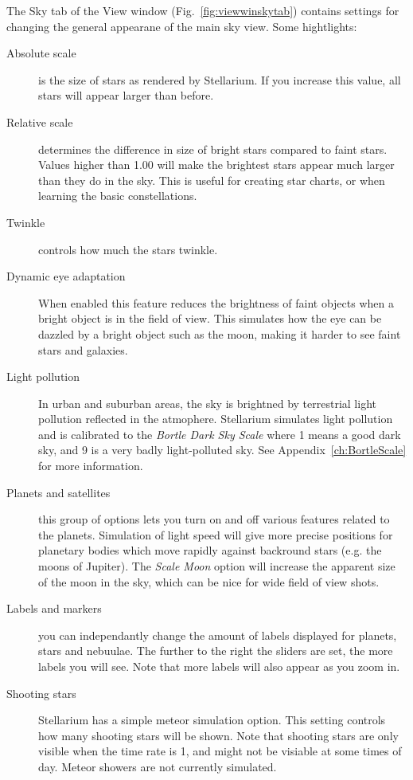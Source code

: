 The Sky tab of the View window (Fig.~\ref{fig:viewwinskytab}) contains settings
for changing the general appearane of the main sky view. Some
hightlights:

\begin{description}
\item[Absolute scale] is the size of stars as rendered by
  Stellarium. If you increase this value, all stars will appear larger
  than before.
\item[Relative scale] determines the difference in size of bright
  stars compared to faint stars. Values higher than 1.00 will make the
  brightest stars appear much larger than they do in the sky. This is
  useful for creating star charts, or when learning the basic
  constellations.
\item[Twinkle] controls how much the stars twinkle.
\item[Dynamic eye adaptation] When enabled this feature reduces the
  brightness of faint objects when a bright object is in the field of
  view. This simulates how the eye can be dazzled by a bright object
  such as the moon, making it harder to see faint stars and galaxies.
\item[Light pollution] In urban and suburban areas, the sky is
  brightned by terrestrial light pollution reflected in the atmophere.
  Stellarium simulates light pollution and is calibrated to the
  \emph{Bortle Dark Sky Scale} where 1 means a good dark sky, and 9 is
  a very badly light-polluted sky. See Appendix~\ref{ch:BortleScale}
  for more information.
\item[Planets and satellites] this group of options lets you turn on
  and off various features related to the planets. Simulation of light
  speed will give more precise positions for planetary bodies which move
  rapidly against backround stars (e.g. the moons of Jupiter). The
  \emph{Scale Moon} option will increase the apparent size of the moon
  in the sky, which can be nice for wide field of view shots.
\item[Labels and markers] you can independantly change the amount of
  labels displayed for planets, stars and nebuulae. The further to the
  right the sliders are set, the more labels you will see. Note that
  more labels will also appear as you zoom in.
\item[Shooting stars] Stellarium has a simple meteor simulation
  option. This setting controls how many shooting stars will be shown.
  Note that shooting stars are only visible when the time rate is 1, and
  might not be visiable at some times of day. Meteor showers are not
  currently simulated.
\end{description}




